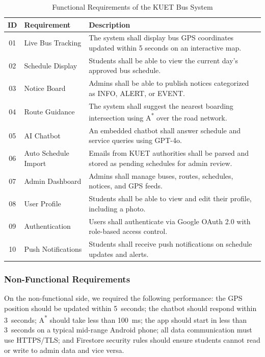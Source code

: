 \documentclass[12pt,a4paper]{report}
\begin{document}
\begin{table}[t]
\caption{Functional Requirements of the KUET Bus System}
\label{tab:funcreq}
\centering
\begin{tabularx}{\linewidth}{clX}
\toprule
\textbf{ID} & \textbf{Requirement} & \textbf{Description}\\
\midrule
01 & Live Bus Tracking    & The system shall display bus GPS coordinates updated within 5 seconds on an interactive map. \\
02 & Schedule Display     & Students shall be able to view the current day's approved bus schedule. \\
03 & Notice Board         & Admins shall be able to publish notices categorized as INFO, ALERT, or EVENT. \\
04 & Route Guidance       & The system shall suggest the nearest boarding intersection using A\textsuperscript{*} over the road network. \\
05 & AI Chatbot           & An embedded chatbot shall answer schedule and service queries using GPT-4o. \\
06 & Auto Schedule Import & Emails from KUET authorities shall be parsed and stored as pending schedules for admin review. \\
07 & Admin Dashboard      & Admins shall manage buses, routes, schedules, notices, and GPS feeds. \\
08 & User Profile         & Students shall be able to view and edit their profile, including a photo. \\
09 & Authentication       & Users shall authenticate via Google OAuth 2.0 with role-based access control. \\
10 & Push Notifications   & Students shall receive push notifications on schedule updates and alerts. \\
\bottomrule
\end{tabularx}
\end{table}

\subsubsection{Non-Functional Requirements}

On the non-functional side, we required the following performance: the GPS position should be updated within 5~seconds; the chatbot should respond within 3~seconds; A\textsuperscript{*} should take less than 100~ms; the app should start in less than 3~seconds on a typical mid-range Android phone; all data communication must use HTTPS/TLS; and Firestore security rules should ensure students cannot read or write to admin data and vice versa.
\end{document}
